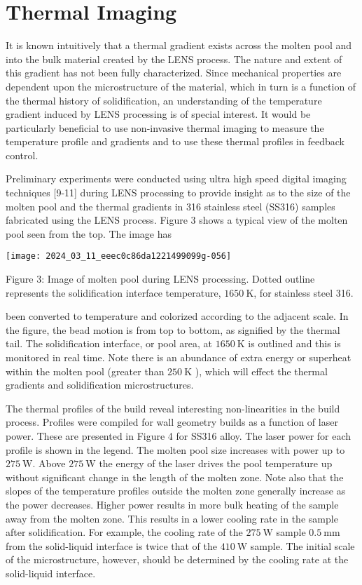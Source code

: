 \documentclass[10pt]{article}
\begin{document}
\section*{Thermal Imaging}
It is known intuitively that a thermal gradient exists across the molten pool and into the bulk material created by the LENS process. The nature and extent of this gradient has not been fully characterized. Since mechanical properties are dependent upon the microstructure of the material, which in turn is a function of the thermal history of solidification, an understanding of the temperature gradient induced by LENS processing is of special interest. It would be particularly beneficial to use non-invasive thermal imaging to measure the temperature profile and gradients and to use these thermal profiles in feedback control.

Preliminary experiments were conducted using ultra high speed digital imaging techniques [9-11] during LENS processing to provide insight as to the size of the molten pool and the thermal gradients in 316 stainless steel (SS316) samples fabricated using the LENS process. Figure 3 shows a typical view of the molten pool seen from the top. The image has

\begin{center}
\texttt{[image: 2024\_03\_11\_eeec0c86da1221499099g-056]}
\end{center}

Figure 3: Image of molten pool during LENS processing. Dotted outline represents the solidification interface temperature, $1650 \mathrm{~K}$, for stainless steel 316.

been converted to temperature and colorized according to the adjacent scale. In the figure, the bead motion is from top to bottom, as signified by the thermal tail. The solidification interface, or pool area, at $1650 \mathrm{~K}$ is outlined and this is monitored in real time. Note there is an abundance of extra energy or superheat within the molten pool (greater than $250 \mathrm{~K}$ ), which will effect the thermal gradients and solidification microstructures.

The thermal profiles of the build reveal interesting non-linearities in the build process. Profiles were compiled for wall geometry builds as a function of laser power. These are presented in Figure 4 for SS316 alloy. The laser power for each profile is shown in the legend. The molten pool size increases with power up to $275 \mathrm{~W}$. Above $275 \mathrm{~W}$ the energy of the laser drives the pool temperature up without significant change in the length of the molten zone. Note also that the slopes of the temperature profiles outside the molten zone generally increase as the power decreases. Higher power results in more bulk heating of the sample away from the molten zone. This results in a lower cooling rate in the sample after solidification. For example, the cooling rate of the $275 \mathrm{~W}$ sample $0.5 \mathrm{~mm}$ from the solid-liquid interface is twice that of the $410 \mathrm{~W}$ sample. The initial scale of the microstructure, however, should be determined by the cooling rate at the solid-liquid interface.
\end{document}
